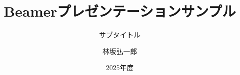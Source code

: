 \documentclass[14pt,dvipdfmx,aspectratio=169]{beamer}
\title{Beamerプレゼンテーションサンプル}
\subtitle{サブタイトル}
\author{林坂弘一郎}
\date{2025年度}
\institute[神戸学院大学]{神戸学院大学 経営学部}
\begin{document}
\frame{\titlepage}
\section[Outline]{}
\frame{\tableofcontents}

\end{document}
